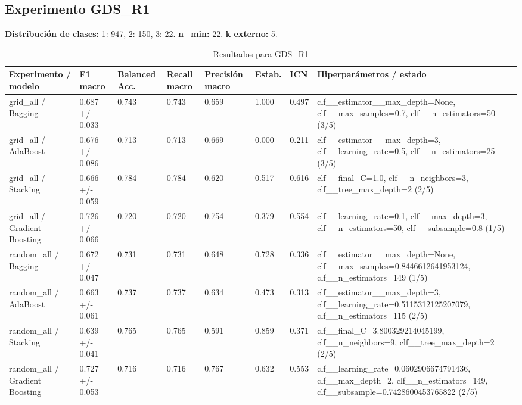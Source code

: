 \documentclass{article}
\begin{document}
\subsection*{Experimento GDS\_R1}
\noindent\textbf{Distribuci\'on de clases:} 1: 947, 2: 150, 3: 22. \textbf{n\_min:} 22. \textbf{k externo:} 5.
\begin{table}[h]
\centering
\caption{Resultados para GDS\_R1}
\scriptsize
\begin{tabular}{p{3.2cm}p{2.0cm}p{1.6cm}p{1.6cm}p{1.8cm}p{1.5cm}p{1.4cm}p{3.4cm}}
\toprule
Experimento / modelo & F1 macro & Balanced Acc. & Recall macro & Precisi\'on macro & Estab. & ICN & Hiperpar\'ametros / estado \\
\midrule
grid\_all / Bagging & 0.687 +/- 0.033 & 0.743 & 0.743 & 0.659 & 1.000 & 0.497 & clf\_\_estimator\_\_max\_depth=None, clf\_\_max\_samples=0.7, clf\_\_n\_estimators=50 (3/5) \\
grid\_all / AdaBoost & 0.676 +/- 0.086 & 0.713 & 0.713 & 0.669 & 0.000 & 0.211 & clf\_\_estimator\_\_max\_depth=3, clf\_\_learning\_rate=0.5, clf\_\_n\_estimators=25 (3/5) \\
grid\_all / Stacking & 0.666 +/- 0.059 & 0.784 & 0.784 & 0.620 & 0.517 & 0.616 & clf\_\_final\_C=1.0, clf\_\_n\_neighbors=3, clf\_\_tree\_max\_depth=2 (2/5) \\
grid\_all / Gradient Boosting & 0.726 +/- 0.066 & 0.720 & 0.720 & 0.754 & 0.379 & 0.554 & clf\_\_learning\_rate=0.1, clf\_\_max\_depth=3, clf\_\_n\_estimators=50, clf\_\_subsample=0.8 (1/5) \\
random\_all / Bagging & 0.672 +/- 0.047 & 0.731 & 0.731 & 0.648 & 0.728 & 0.336 & clf\_\_estimator\_\_max\_depth=None, clf\_\_max\_samples=0.8446612641953124, clf\_\_n\_estimators=149 (1/5) \\
random\_all / AdaBoost & 0.663 +/- 0.061 & 0.737 & 0.737 & 0.634 & 0.473 & 0.313 & clf\_\_estimator\_\_max\_depth=3, clf\_\_learning\_rate=0.5115312125207079, clf\_\_n\_estimators=115 (2/5) \\
random\_all / Stacking & 0.639 +/- 0.041 & 0.765 & 0.765 & 0.591 & 0.859 & 0.371 & clf\_\_final\_C=3.800329214045199, clf\_\_n\_neighbors=9, clf\_\_tree\_max\_depth=2 (2/5) \\
random\_all / Gradient Boosting & 0.727 +/- 0.053 & 0.716 & 0.716 & 0.767 & 0.632 & 0.553 & clf\_\_learning\_rate=0.0602906674791436, clf\_\_max\_depth=2, clf\_\_n\_estimators=149, clf\_\_subsample=0.7428600453765822 (2/5) \\
\bottomrule
\end{tabular}
\end{table}
\end{document}
